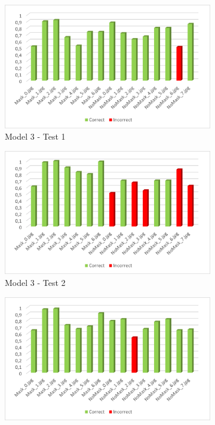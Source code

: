 \documentclass[a4paper,12pt]{article}
\begin{document}
\begin{figure}%
    \centering
    \begin{subfigure}{6cm}
        \includegraphics[width=\linewidth]{images_latex/test3_1.png}
        \caption{Model 3 - Test 1}
        \label{fig:t3_1}
    \end{subfigure}
    \qquad
    \begin{subfigure}{6cm}
        \includegraphics[width=\linewidth]{images_latex/test3_2.png}
        \caption{ Model 3 - Test 2}
    \end{subfigure}
    \qquad
    \begin{subfigure}{6cm}
        \includegraphics[width=\linewidth]{images_latex/test3_3.png}

\end{subfigure}
\end{figure}
\end{document}
